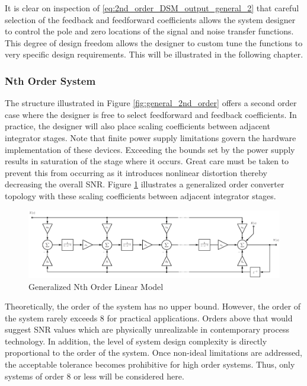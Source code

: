 It is clear on inspection of \eqref{eq:2nd_order_DSM_output_general_2} that careful
selection of the feedback and feedforward coefficients allows the system designer to
control the pole and zero locations of the signal and noise transfer functions. This
degree of design freedom allows the designer to custom tune the functions to very specific
design requirements. This will be illustrated in the following chapter.

\subsubsection{Nth Order System}
The structure illustrated in Figure \ref{fig:general_2nd_order} offers a second
order case where the designer is free to select feedforward and feedback coefficients. In
practice, the designer will also place scaling coefficients between adjacent integrator stages.
Note that finite power supply limitations govern the hardware implementation of these devices.
Exceeding the bounds set by the power supply results in saturation of the stage where
it occurs. Great care must be taken to prevent this from occurring as it introduces
nonlinear distortion thereby decreasing the overall SNR. Figure
\ref{fig:linear_z_model_nth_order} illustrates a generalized \nth \space order converter
topology with these scaling coefficients between adjacent integrator stages.

\begin{figure}
  \centering
  \includegraphics[width=\textwidth]{./final_figures/general_nth_order_2.eps}
  \caption{Generalized Nth Order Linear Model}
  \label{fig:linear_z_model_nth_order}
\end{figure}

Theoretically, the order of the system has no upper bound. However, the order of the
system rarely exceeds 8 for practical applications. Orders above that would suggest SNR values 
which are physically unrealizable in contemporary process technology. In addition, the level of system 
design complexity is directly proportional to the order of the system. Once non-ideal limitations are 
addressed, the acceptable tolerance becomes prohibitive for high order systems.  Thus, only systems of order 8 or less will be considered here. 

